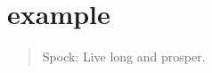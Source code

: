 \section{example}

\begin{quote}{Spock: }
    Live long and prosper.\cite{wiki:VulcanSalute}
\end{quote}
